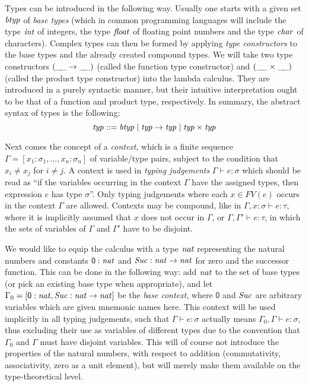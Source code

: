 Types can be introduced in the following way. Usually one starts with a given
set $\mathit{btyp}$ of \emph{base types} (which in common programming languages
will include the type $\mathit{int}$ of integers, the type $\mathit{float}$ of floating point
numbers and the type $\mathit{char}$ of characters). Complex types can then be
formed by applying \emph{type constructors} to the base types and the already
created compound types. We will take two type constructors $(\_\!\_ \to\_\!\_)$
(called the function type constructor) and $(\_\!\_ \times \_\!\_)$ (called
the product type constructor) into the lambda calculus. They are introduced in a
purely syntactic manner, but their intuitive interpretation ought to be that of
a function and product type, respectively. In summary, the abstract syntax of
types is the following:
\begin{equation}
\label{eq:syntax-types}
  \mathit{typ} ::= \mathit{btyp} \;|\; \mathit{typ} \to \mathit{typ} \;|\; \mathit{typ} \times \mathit{typ}
\end{equation}

Next comes the concept of a \emph{context}, which is a finite sequence $\Gamma =
[x_1:\sigma_1, \ldots, x_n:\sigma_n]$ of variable/type pairs, subject to the condition that
$x_i \neq x_j$ for $i \neq j$. A context is used in \emph{typing judgements} $\Gamma \vdash e :
\sigma$ which should be read as ``if the variables occurring in the context $\Gamma$
have the assigned types, then expression $e$ has type $\sigma$''. Only typing
judgements where each $x \in FV(e)$ occurs in the context $\Gamma$ are allowed. Contexts
may be compound, like in $\Gamma, x:\sigma \vdash e : \tau$, where it is implicitly
assumed that $x$ does not occur in $\Gamma$, or $\Gamma, \Gamma' \vdash e : \tau$, in which the sets of
variables of $\Gamma$ and $\Gamma'$ have to be disjoint.

We would like to equip the calculus with a type $\mathit{nat}$ representing the
natural numbers and constants $\mathsf{0} : \mathit{nat}$ and $\mathit{Suc} : \mathit{nat} \to
\mathit{nat}$ for zero and the successor function. This can be done in the
following way: add $\mathit{nat}$ to the set of base types (or pick an existing
base type when appropriate), and let $\Gamma_0 = [\mathsf{0} : \mathit{nat}, \mathit{Suc} :
\mathit{nat} \to \mathit{nat}]$ be the \emph{base context}, where $\mathsf{0}$ and
$\mathit{Suc}$ are arbitrary variables which are given mnemonic names here. This context
will be used implicitly in all typing judgements, such that $\Gamma \vdash e : \sigma$ actually
means $\Gamma_0, \Gamma \vdash e : \sigma$, thus excluding their use as variables of different types
due to the convention that $\Gamma_0$ and $\Gamma$ must have disjoint variables. This
will of course not introduce the properties of the natural numbers, \EG with respect to
addition (commutativity, associativity, zero as a unit element), but will merely
make them available on the type-theoretical level.

